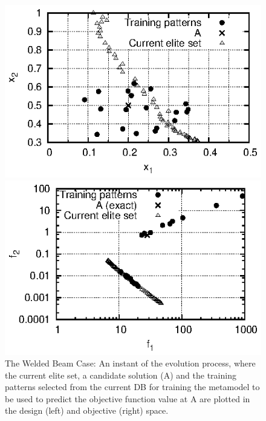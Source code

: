 \begin{figure}
\begin{minipage}{0.48\textwidth}
\includegraphics[scale=1.2]{IPE/x1_x2.eps}
\end{minipage}
\begin{minipage}{0.48\textwidth}
\includegraphics[scale=1.2]{IPE/f1_f2.eps}
\end{minipage}
\caption{The Welded Beam Case: An instant of the evolution process, where the current elite set, a candidate solution (A) and the training patterns selected from the current DB for training the metamodel to be used to predict the objective function value at A are plotted in the design (left) and objective (right) space.}
\label{fig:f1f2}
\end{figure}

